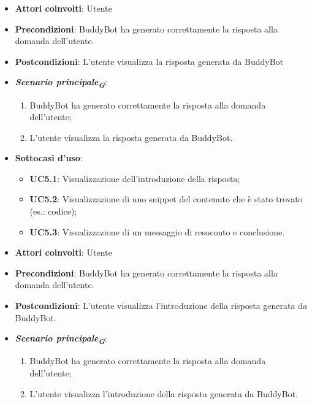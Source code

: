 \begin{itemize}
    \item \textbf{Attori coinvolti}: Utente
    \item \textbf{Precondizioni}: BuddyBot ha generato correttamente la risposta alla domanda dell'utente.
    \item \textbf{Postcondizioni}: L'utente visualizza la risposta generata da BuddyBot
    \item \textbf{\emph{Scenario principale}\textsubscript{\textbf{\textit{G}}}}:
    \begin{enumerate}
        \item BuddyBot ha generato correttamente la risposta alla domanda dell'utente;
        \item L'utente visualizza la risposta generata da BuddyBot.
    \end{enumerate}
    \item \textbf{Sottocasi d'uso}:
    \begin{itemize}
        \item \textbf{UC5.1}: Visualizzazione dell'introduzione della risposta;
        \item \textbf{UC5.2}: Visualizzazione di uno snippet del contenuto che è stato trovato (es.: codice);
        \item \textbf{UC5.3}: Visualizzazione di un messaggio di resoconto e conclusione.
    \end{itemize}
\end{itemize}




\begin{itemize}
    \item \textbf{Attori coinvolti}: Utente
    \item \textbf{Precondizioni}: BuddyBot ha generato correttamente la risposta alla domanda dell'utente.
    \item \textbf{Postcondizioni}: L'utente visualizza l'introduzione della risposta generata da BuddyBot.
    \item \textbf{\emph{Scenario principale}\textsubscript{\textbf{\textit{G}}}}:
    \begin{enumerate}
        \item BuddyBot ha generato correttamente la risposta alla domanda dell'utente;
        \item L'utente visualizza l'introduzione della risposta generata da BuddyBot.
    \end{enumerate}
\end{itemize}



